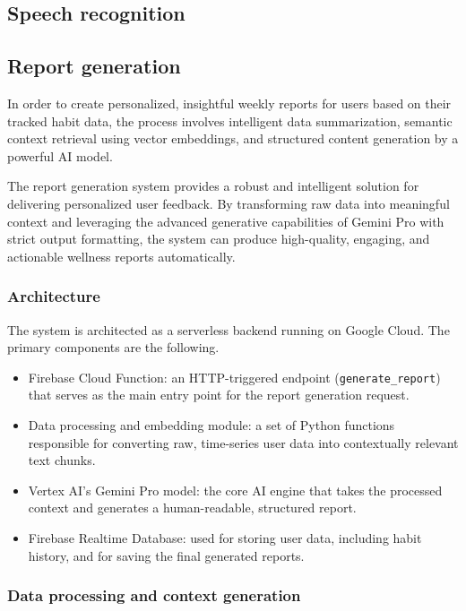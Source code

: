 \documentclass{article}
\begin{document}
\subsection{Speech recognition}


\subsection{Report generation}

In order to create personalized, insightful weekly reports for users based on their tracked habit data, the process involves intelligent data summarization, semantic context retrieval using vector embeddings, and structured content generation by a powerful AI model.

The report generation system provides a robust and intelligent solution for delivering personalized user feedback.
By transforming raw data into meaningful context and leveraging the advanced generative capabilities of Gemini Pro with strict output formatting, the system can produce high-quality, engaging, and actionable wellness reports automatically.

\subsubsection{Architecture}

The system is architected as a serverless backend running on Google Cloud.
The primary components are the following.

\begin{itemize}
	\item Firebase Cloud Function: an HTTP-triggered endpoint (\verb|generate_report|) that serves as the main entry point for the report generation request.
	\item Data processing and embedding module: a set of Python functions responsible for converting raw, time-series user data into contextually relevant text chunks.
	\item Vertex AI’s Gemini Pro model: the core AI engine that takes the processed context and generates a human-readable, structured report.
	\item Firebase Realtime Database: used for storing user data, including habit history, and for saving the final generated reports.
\end{itemize}

\subsubsection{Data processing and context generation}
\end{document}
